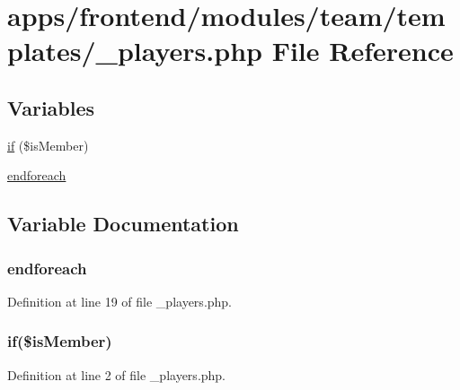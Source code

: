 \hypertarget{frontend_2modules_2team_2templates_2__players_8php}{\section{apps/frontend/modules/team/templates/\-\_\-players.php File Reference}
\label{frontend_2modules_2team_2templates_2__players_8php}
}
\subsection*{Variables}
\begin{DoxyCompactItemize}
\item 
\hyperlink{frontend_2modules_2team_2templates_2__players_8php_aba24f0cb34167ea91aec8dca6cb9d558}{if} (\$is\-Member)
\item 
\hyperlink{frontend_2modules_2team_2templates_2__players_8php_a672d9707ef91db026c210f98cc601123}{endforeach}
\end{DoxyCompactItemize}


\subsection{Variable Documentation}
\hypertarget{frontend_2modules_2team_2templates_2__players_8php_a672d9707ef91db026c210f98cc601123}{
\subsubsection[{endforeach}]{\setlength{\rightskip}{0pt plus 5cm}endforeach}}\label{frontend_2modules_2team_2templates_2__players_8php_a672d9707ef91db026c210f98cc601123}


Definition at line 19 of file \-\_\-players.\-php.

\hypertarget{frontend_2modules_2team_2templates_2__players_8php_aba24f0cb34167ea91aec8dca6cb9d558}{
\subsubsection[{if}]{\setlength{\rightskip}{0pt plus 5cm}if(\$is\-Member)}}\label{frontend_2modules_2team_2templates_2__players_8php_aba24f0cb34167ea91aec8dca6cb9d558}


Definition at line 2 of file \-\_\-players.\-php.

